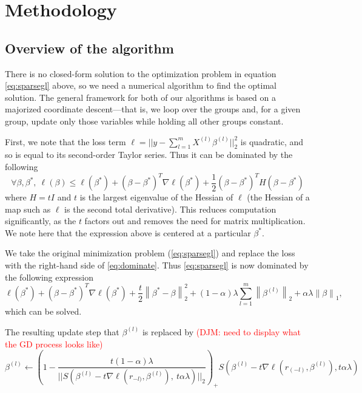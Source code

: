 \documentclass[titlepage]{article}
\newcommand{\djm}[1]{\textcolor{red}{(DJM: #1)}}
\newcommand{\norm}[1]{\left\lVert #1 \right\rVert}
\begin{document}
\section{Methodology}
\label{Sec:meth}

\subsection{Overview of the algorithm}

There is no closed-form solution to the optimization problem in equation \autoref{eq:sparsegl} above, so we need a numerical algorithm to find the optimal solution. The general framework for both of our algorithms is based on a majorized coordinate descent\citep{yang2015fast, simon2013sparse}---that is, we loop over the groups and, for a given group, update only those variables while holding all other groups constant. 

First, we note that the loss term $\ell=||y-\sum_{l=1}^mX^{(l)}\beta^{(l)}||_2^2$ is quadratic, and so is equal to its second-order Taylor series. Thus it can be dominated by the following
\begin{equation}
\forall \beta,\beta^*,\ \ell(\beta) \leq \ell(\beta^*)+(\beta - \beta^*)^T\nabla \ell(\beta^*)+\frac{1}{2}(\beta - \beta^*)^T H (\beta - \beta^*)
\label{eq:dominate}
\end{equation}
where $H = tI$ and $t$ is the largest eigenvalue of the Hessian of $\ell$ (the Hessian of a map such as $\ell$ is the second total derivative). This reduces computation significantly, as the $t$ factors out and removes the need for matrix multiplication. We note here that the expression above is centered at a particular $\beta^*$.

We take the original minimization problem (\autoref{eq:sparsegl}) and replace the loss with the right-hand side of \autoref{eq:dominate}. Thus \autoref{eq:sparsegl} is now dominated by the following expression
\begin{equation}
\ell(\beta^*)+(\beta - \beta^*)^T\nabla \ell(\beta^*)+\frac{t}{2}\norm{\beta^*-\beta}_2^2+ (1-\alpha)\lambda\sum_{l=1}^m\norm{\beta^{(l)}}_2+\alpha\lambda\norm{\beta}_1,
\end{equation}
which can be solved. 


The resulting update step that $\beta^{(l)}$ is replaced by \djm{need to display what the GD process looks like}
\begin{equation}
\beta^{(l)} \leftarrow\left(1-\frac{t(1-\alpha)\lambda}{||S(\beta^{(l)}-t\nabla \ell(r_{-l)},\beta^{(l)}),\ t\alpha\lambda)||_2}\right)_+ S(\beta^{(l)}-t\nabla \ell(r_{(-l)},\beta^{(l)}),t\alpha\lambda)
\label{eq:updateStep}
\end{equation}
\end{document}
